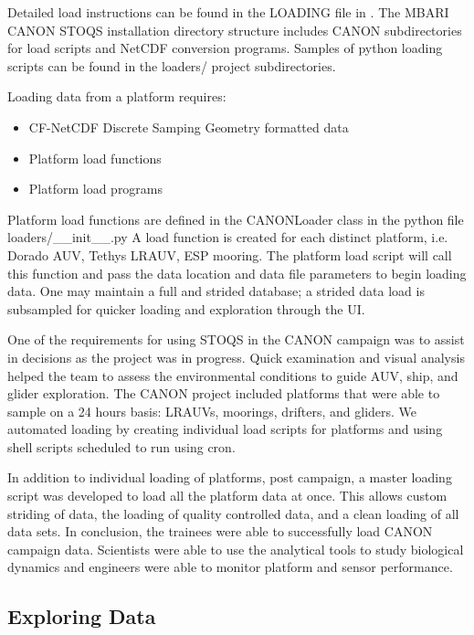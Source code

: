 \documentclass[conference]{IEEEtran}
\begin{document}
Detailed load instructions can be found in the LOADING file in \cite{STOQS}. The MBARI CANON STOQS installation directory structure includes CANON subdirectories for load scripts and NetCDF conversion programs. Samples of python loading scripts can be found in the loaders/ project subdirectories. 

Loading data from a platform requires:

\begin{itemize}
\item CF-NetCDF Discrete Samping Geometry formatted data
\item Platform load functions
\item Platform load programs
\end{itemize}

Platform load functions are defined in the CANONLoader class in the python file loaders/\_\_init\_\_.py   A load function is created for each distinct platform, i.e. Dorado AUV, Tethys LRAUV, ESP mooring. The platform load script will call this function and pass the data location and data file parameters to begin loading data.  One may maintain a full and strided database; a strided data load is subsampled for quicker loading and exploration through the UI.

One of the requirements for using STOQS in the CANON campaign was to assist in decisions as the project was in progress. Quick examination and visual analysis helped the team to assess the environmental conditions to guide AUV, ship, and glider exploration.  The CANON project included platforms that were able to sample on a 24 hours basis: LRAUVs, moorings, drifters, and gliders. We automated loading by creating individual load scripts for platforms and using shell scripts scheduled to run using cron. 

In addition to individual loading of platforms, post campaign, a master loading script was developed to load all the platform data at once.  This allows custom striding of data, the loading of quality controlled data, and a clean loading of all data sets.  In conclusion, the trainees were able to successfully load CANON campaign data.  Scientists were able to use the analytical tools to study biological dynamics and engineers were able to monitor platform and sensor performance.  



\subsection{Exploring Data}
\end{document}
